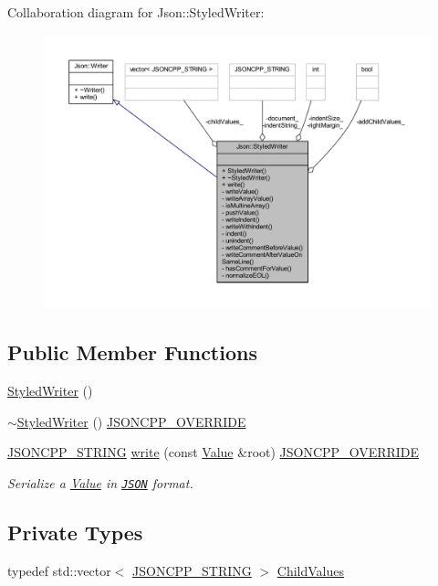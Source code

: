 Collaboration diagram for Json\+:\+:Styled\+Writer\+:\nopagebreak
\begin{figure}[H]
\begin{center}
\leavevmode
\includegraphics[width=350pt]{class_json_1_1_styled_writer__coll__graph}
\end{center}
\end{figure}
\subsection*{Public Member Functions}
\begin{DoxyCompactItemize}
\item 
\hyperlink{class_json_1_1_styled_writer_a1f1b5f922a6a0ef0e56c6dd2f6170192}{Styled\+Writer} ()
\item 
\hyperlink{class_json_1_1_styled_writer_a6a18380a4c5dd5e37a892dc182aac88c}{$\sim$\+Styled\+Writer} () \hyperlink{json_8h_a824d6199c91488107e443226fa6022c5}{J\+S\+O\+N\+C\+P\+P\+\_\+\+O\+V\+E\+R\+R\+I\+DE}
\item 
\hyperlink{json_8h_a1e723f95759de062585bc4a8fd3fa4be}{J\+S\+O\+N\+C\+P\+P\+\_\+\+S\+T\+R\+I\+NG} \hyperlink{class_json_1_1_styled_writer_a5efab19b9746da9920c29cdae3a6b404}{write} (const \hyperlink{class_json_1_1_value}{Value} \&root) \hyperlink{json_8h_a824d6199c91488107e443226fa6022c5}{J\+S\+O\+N\+C\+P\+P\+\_\+\+O\+V\+E\+R\+R\+I\+DE}
\begin{DoxyCompactList}\small\item\em Serialize a \hyperlink{class_json_1_1_value}{Value} in \href{http://www.json.org}{\tt J\+S\+ON} format. \end{DoxyCompactList}\end{DoxyCompactItemize}
\subsection*{Private Types}
\begin{DoxyCompactItemize}
\item 
typedef std\+::vector$<$ \hyperlink{json_8h_a1e723f95759de062585bc4a8fd3fa4be}{J\+S\+O\+N\+C\+P\+P\+\_\+\+S\+T\+R\+I\+NG} $>$ \hyperlink{class_json_1_1_styled_writer_a798fcefa41730de612a5cf7e73003e8a}{Child\+Values}
\end{DoxyCompactItemize}
